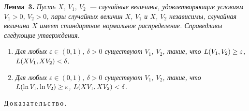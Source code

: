 \begin{multicols}{2}
\noindent
\textbf{Лемма~3.} \textit{Пусть $X$,  $V_1$, $V_2$~--- случайные величины, удовлетворяющие
условиям $V_1 > 0$, $V_2 > 0$, пары случайных величин  $X$,  $V_1$ и
$X$,  $V_2$ независимы, случайная величина $X$ имеет стандартное
нормальное распределение. Справедливы следующие утверждения.}
\begin{enumerate}
  \item \textit{Для любых $\varepsilon\in(0,1)$, $\delta>0$ существуют $V_1$, $V_2$, такие, что
  $L(V_1, V_2) \hm\ge \varepsilon$, $L(X V_1, X V_2) \hm<\delta$}.
  \item \textit{Для любых $\varepsilon\in(0,1)$, $\delta>0$ существуют $V_1$, $V_2$, такие, что
  $L(\ln V_1, \ln V_2) \hm\ge \varepsilon$, $L(X V_1, X V_2)\hm <\delta$}.
\end{enumerate}


\medskip

\noindent
Д\,о\,к\,а\,з\,а\,т\,е\,л\,ь\,с\,т\,в\,о\,.\ 



\end{multicols}
